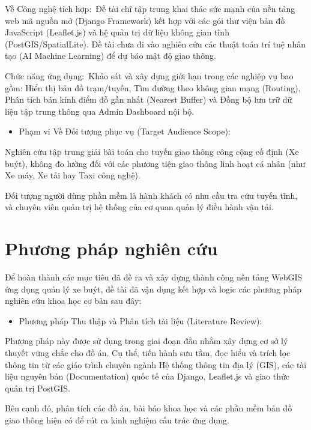 \documentclass[13pt,a4paper]{report}
\begin{document}
Về Công nghệ tích hợp: Đề tài chỉ tập trung khai thác sức mạnh của nền tảng web mã nguồn mở (Django Framework) kết hợp với các gói thư viện bản đồ JavaScript (Leaflet.js) và hệ quản trị dữ liệu không gian tĩnh (PostGIS/SpatialLite). Đề tài chưa đi vào nghiên cứu các thuật toán trí tuệ nhân tạo (AI Machine Learning) để dự báo mật độ giao thông.

Chức năng ứng dụng: Khảo sát và xây dựng giới hạn trong các nghiệp vụ bao gồm: Hiển thị bản đồ trạm/tuyến, Tìm đường theo không gian mạng (Routing), Phân tích bán kính điểm đỗ gần nhất (Nearest Buffer) và Đồng bộ lưu trữ dữ liệu tập trung thông qua Admin Dashboard nội bộ.

\begin{itemize}
    \item Phạm vi Về Đối tượng phục vụ (Target Audience Scope):
\end{itemize}

Nghiên cứu tập trung giải bài toán cho tuyến giao thông công cộng cố định (Xe buýt), không đo lường đối với các phương tiện giao thông linh hoạt cá nhân (như Xe máy, Xe tải hay Taxi công nghệ).

Đối tượng người dùng phần mềm là hành khách có nhu cầu tra cứu tuyến tĩnh, và chuyên viên quản trị hệ thống của cơ quan quản lý điều hành vận tải.

\section{Phương pháp nghiên cứu}

Để hoàn thành các mục tiêu đã đề ra và xây dựng thành công nền tảng WebGIS ứng dụng quản lý xe buýt, đề tài đã vận dụng kết hợp và logic các phương pháp nghiên cứu khoa học cơ bản sau đây:

\begin{itemize}
    \item Phương pháp Thu thập và Phân tích tài liệu (Literature Review):
\end{itemize}

Phương pháp này được sử dụng trong giai đoạn đầu nhằm xây dựng cơ sở lý thuyết vững chắc cho đồ án. Cụ thể, tiến hành sưu tầm, đọc hiểu và trích lọc thông tin từ các giáo trình chuyên ngành Hệ thống thông tin địa lý (GIS), các tài liệu nguyên bản (Documentation) quốc tế của Django, Leaflet.js và giao thức quản trị PostGIS.

Bên cạnh đó, phân tích các đồ án, bài báo khoa học và các phần mềm bản đồ giao thông hiện có để rút ra kinh nghiệm cấu trúc ứng dụng.
\end{document}
